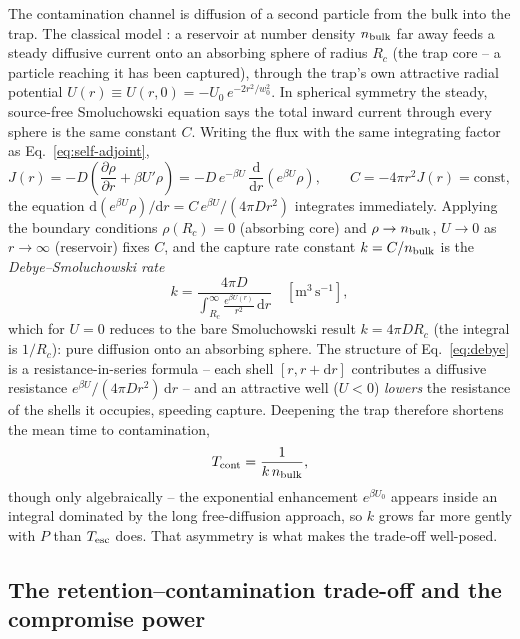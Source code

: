 \documentclass[11pt]{article}
\newcommand{\dd}{\mathrm{d}}
\newcommand{\pdv}[2]{\dfrac{\partial #1}{\partial #2}}
\begin{document}
The contamination channel is diffusion of a second particle from the bulk into the trap. The classical model \cite{Smoluchowski1917,Debye1942}: a reservoir at number density $n_{\rm bulk}$ far away feeds a steady diffusive current onto an absorbing sphere of radius $R_c$ (the trap core -- a particle reaching it has been captured), through the trap's own attractive radial potential $U(r) \equiv U(r,0) = -U_0\,e^{-2r^2/w_0^2}$. In spherical symmetry the steady, source-free Smoluchowski equation says the total inward current through every sphere is the same constant $C$. Writing the flux with the same integrating factor as Eq.~\eqref{eq:self-adjoint},
\begin{equation}
J(r) = -D\left(\pdv{\rho}{r} + \beta U'\rho\right)
= -D\,e^{-\beta U}\,\frac{\dd}{\dd r}\!\left(e^{\beta U}\rho\right),
\qquad
C = -4\pi r^2 J(r) = \text{const},
\end{equation}
the equation $\dd(e^{\beta U}\rho)/\dd r = C\,e^{\beta U}/(4\pi D r^2)$ integrates immediately. Applying the boundary conditions $\rho(R_c) = 0$ (absorbing core) and $\rho \to n_{\rm bulk}$, $U\to0$ as $r\to\infty$ (reservoir) fixes $C$, and the capture rate constant $k = C/n_{\rm bulk}$ is the \emph{Debye--Smoluchowski rate}
\begin{equation}
\boxed{\;
k = \frac{4\pi D}{\displaystyle\int_{R_c}^{\infty} \frac{e^{\beta U(r)}}{r^2}\,\dd r}
\quad [\mathrm{m^3\,s^{-1}}],
\;}
\label{eq:debye}
\end{equation}
which for $U=0$ reduces to the bare Smoluchowski result $k = 4\pi D R_c$ (the integral is $1/R_c$): pure diffusion onto an absorbing sphere. The structure of Eq.~\eqref{eq:debye} is a resistance-in-series formula -- each shell $[r, r+\dd r]$ contributes a diffusive resistance $e^{\beta U}/(4\pi D r^2)\,\dd r$ -- and an attractive well ($U<0$) \emph{lowers} the resistance of the shells it occupies, speeding capture. Deepening the trap therefore shortens the mean time to contamination,
\begin{equation}
T_{\rm cont} = \frac{1}{k\,n_{\rm bulk}},
\label{eq:tcont}
\end{equation}
though only algebraically -- the exponential enhancement $e^{\beta U_0}$ appears inside an integral dominated by the long free-diffusion approach, so $k$ grows far more gently with $P$ than $T_{\rm esc}$ does. That asymmetry is what makes the trade-off well-posed.

\subsection{The retention--contamination trade-off and the compromise power}
\label{sec:tradeoff}
\end{document}
